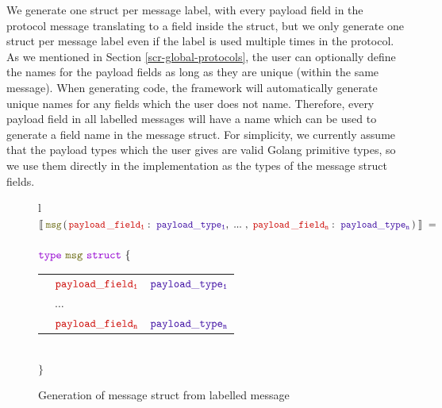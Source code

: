 \documentclass[12pt,twoside]{report}
\begin{document}
We generate one struct per message label, with every payload field in the protocol message translating to a field inside the struct, but we only generate one struct per message label even if the label is used multiple times in the protocol. As we mentioned in Section \ref{scr-global-protocols}, the user can optionally define the names for the payload fields as long as they are unique (within the same message). When generating code, the framework will automatically generate unique names for any fields which the user does not name. Therefore, every payload field in all labelled messages will have a name which can be used to generate a field name in the message struct. For simplicity, we currently assume that the payload types which the user gives are valid Golang primitive types, so we use them directly in the implementation as the types of the message struct fields.

\begin{figure}[!h]
    \begin{center}
        \begin{tabular}{l}
            $\llbracket\;\structname{msg}\,(\,\payloaddecl{payload\,\_field}{payload\_type}{n}\,)\;\rrbracket\ = $\\\\
        
            $\gotype\ \structname{msg}\ \gostruct\ \{$\\[3pt]
            \begin{tabular}{lll}
                \indent & $\structfield{payload\_field_1}$ & $\typename{payload\_type_1}$\\
                \indent & $\dots$ &\\
                \indent & $\structfield{payload\_field_n}$ & $\typename{payload\_type_n}$
            \end{tabular}\\
        
            $\}$
        \end{tabular}
    \end{center}
    \caption{Generation of message struct from labelled message}
    \label{msg-struct-codegen}
\end{figure}
\end{document}
